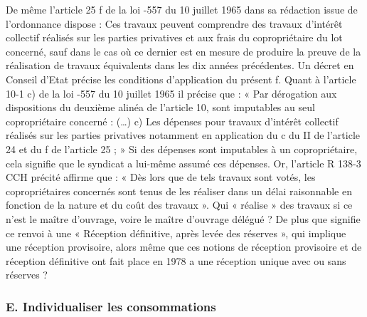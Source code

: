 		De même l’article 25 f de la loi -557 du 10 juillet 1965 dans sa rédaction issue de l’ordonnance dispose :
		Ces travaux peuvent comprendre des travaux d'intérêt collectif réalisés sur les parties privatives et aux frais du copropriétaire du lot concerné, sauf dans le cas où ce dernier est en mesure de produire la preuve de la réalisation de travaux équivalents dans les dix années précédentes.
		Un décret en Conseil d'Etat précise les conditions d'application du présent f.
		Quant à l’article 10-1 c) de la loi -557 du 10 juillet 1965 il précise que :
		« Par dérogation aux dispositions du deuxième alinéa de l'article 10, sont imputables au seul copropriétaire concerné : (…)
		c) Les dépenses pour travaux d'intérêt collectif réalisés sur les parties privatives notamment en application du c du II de l'article 24 et du f de l'article 25 ; »
		Si des dépenses sont imputables à un copropriétaire, cela signifie que le syndicat a lui-même assumé ces dépenses. Or, l’article R 138-3 CCH précité affirme que :
		« Dès lors que de tels travaux sont votés, les copropriétaires concernés sont tenus de les réaliser dans un délai raisonnable en fonction de la nature et du coût des travaux ».
		Qui « réalise » des travaux si ce n’est le maître d’ouvrage, voire le maître d’ouvrage délégué ?
		De plus que signifie ce renvoi à une « Réception définitive, après levée des réserves », qui implique une réception provisoire, alors même que ces notions de réception provisoire et de réception définitive ont fait place en 1978 a une réception unique avec ou sans réserves ?
		
		\subsubsection{E. Individualiser les consommations}
		

